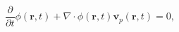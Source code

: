 \begin{equation}
\frac{\partial}{\partial t}\phi (\mathbf{r},t) +
\nabla \cdot \phi (\mathbf{r},t) \overline{
\mathbf{v}_p}(\mathbf{r},t)  = 0,
 \label{eq:eomaveraged2}
\end{equation}
